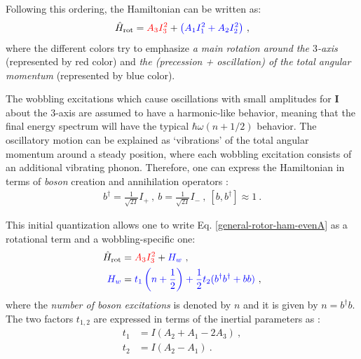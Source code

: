 Following this ordering, the Hamiltonian can be written as:
\begin{align}
    \hat{H}_\text{rot}={\color{red}A_3I_3^2}+{\color{blue}\left(A_1I_1^2+A_2I_2^2\right)}\ ,
    \label{general-rotor-ham-evenA}
\end{align}
where the different colors try to emphasize \emph{a main rotation around the $3$-axis} (represented by red color) and \emph{the (precession + oscillation) of the total angular momentum} (represented by blue color).

The wobbling excitations which cause oscillations with small amplitudes for $\mathbf{I}$ about the $3$-axis are assumed to have a harmonic-like behavior, meaning that the final energy spectrum will have the typical $\hbar\omega(n+1/2)$ behavior. The oscillatory motion can be explained as `vibrations' of the total angular momentum around a steady position, where each wobbling excitation consists of an additional vibrating phonon. Therefore, one can express the Hamiltonian in terms of \emph{boson} creation and annihilation operators \cite{bohr1998nuclear}:
\begin{align}
    b^\dagger=\frac{1}{\sqrt{2I}}I_+\ ,\ b=\frac{1}{\sqrt{2I}}I_-\ ,\ \left[b,b^\dagger\right]\approx 1\ .
\end{align}

This initial quantization allows one to write Eq. \ref{general-rotor-ham-evenA} as a rotational term and a wobbling-specific one:
\begin{align}
    \hat{H}_\text{rot}&={\color{red}A_3I_3^2}+{\color{blue}H_w}\ ,\label{rot-ham-non-diagonal} \\
    {\color{blue}H_w}&={\color{blue}t_1\left(n+\frac{1}{2}\right)+\frac{1}{2}t_2(b^\dagger b^\dagger + bb)}\ ,
    \label{wob-ham-non-diagonal}
\end{align}
where the \emph{number of boson excitations} is denoted by $n$ and it is given by $n=b^\dagger b$. 
The two factors $t_{1,2}$ are expressed in terms of the inertial parameters as \cite{bohr1998nuclear}:
\begin{align}
    t_1&=I(A_2+A_1-2A_3)\ , \\
    t_2&=I(A_2-A_1)\ .
    \label{t1-t2-terms}
\end{align}

